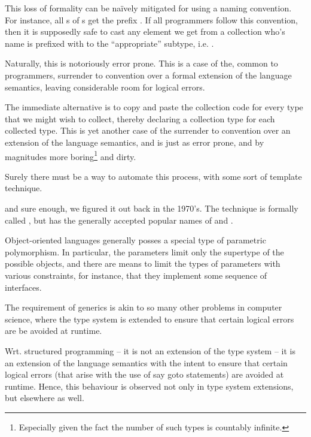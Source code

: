 This loss of formality can be na\"ively mitigated for using a naming
convention. For instance, all s of s get
the prefix . If all programmers follow this convention,
then it is supposedly safe to cast any element we get from a collection who's
name is prefixed with  to the ``appropriate'' subtype,
i.e. .

Naturally, this is notoriously error prone. This is a case of the, common to
programmers, surrender to convention over a formal extension of the language
semantics, leaving considerable room for logical errors.

The immediate alternative is to copy and paste the collection code for every
type that we might wish to collect, thereby declaring a collection type for
each collected type. This is yet another case of the surrender to convention
over an extension of the language semantics, and is just as error prone, and by
magnitudes more boring\footnote{Especially given the fact the number of such
types is countably infinite.} and dirty.

Surely there must be a way to automate this process, with some sort of template technique.

 and sure
enough, we figured it out back in the
1970's\cite{the-c++-programming-language}. The technique is formally called
, but has the generally accepted popular names of
 and .

Object-oriented languages generally posses a special type of parametric
polymorphism. In particular, the parameters limit only the supertype of the
possible objects, and there are means to limit the types of parameters with
various constraints, for instance, that they implement some sequence of
interfaces.

\newpage


The requirement of generics is akin to so many other problems in computer
science, where the type system is extended to ensure that certain logical
errors are be avoided at runtime.

Wrt. structured programming -- it is not an extension of the type system -- it
is an extension of the language semantics with the intent to ensure that
certain logical errors (that arise with the use of say goto statements) are
avoided at runtime. Hence, this behaviour is observed not only in type system
extensions, but elsewhere as well.
